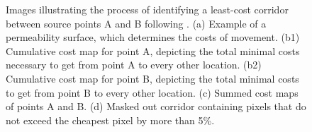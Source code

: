 \documentclass[abstract=off,10pt,a4paper,bibliography=totocnumbered]{article}
\begin{document}
\begin{figure}[hbtp]
\begin{center}
  \caption{Images illustrating the process of identifying a least-cost corridor
  between source points A and B following \cite{Pinto.2009}. (a) Example of a
  permeability surface, which determines the costs of movement. (b1) Cumulative
  cost map for point A, depicting the total minimal costs necessary to get from
  point A to every other location. (b2) Cumulative cost map for point B,
  depicting the total minimal costs to get from point B to every other location.
  (c) Summed cost maps of points A and B. (d) Masked out corridor containing
  pixels that do not exceed the cheapest pixel by more than 5\%.}
  \label{LCCExample}
  \end{center}
\end{figure}

\newpage
\end{document}
